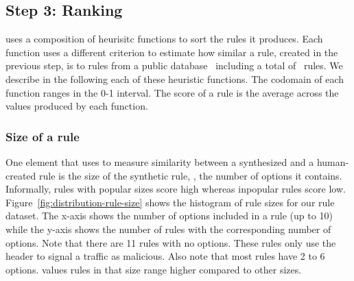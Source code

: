 \documentclass[sigconf,review, anonymous]{acmart}
\begin{document}
\subsection{Step 3: Ranking}

\tname{} uses a composition of heurisitc functions to sort the rules
it produces. Each function uses a different criterion to estimate how
similar a rule, created in the previous step, is to rules from a
public database~\cite{emerging-threats-open} including a total of
\numrulessuri\ rules. We describe in the following each of these
heuristic functions. The codomain of each function ranges in the 0-1
interval. The score of a rule is the average across the values
produced by each function.


\subsubsection{Size of a rule}
One element that \tname{} uses to measure similarity between a
synthesized and a human-created rule is the size of the synthetic
rule, \ie{}, the number of options it contains. Informally, rules with
popular sizes score high whereas inpopular rules score
low. Figure~\ref{fig:distribution-rule-size} shows the histogram of
rule sizes for our rule dataset. The x-axis shows the number of
options included in a rule (up to 10) while the y-axis shows the
number of rules with the corresponding number of options. Note that
there are 11 rules with no options. These rules only use the header to
signal a traffic as malicious. Also note that most rules have 2 to 6
options. \tname{} values rules in that size range higher compared to
other sizes.


\pgfplotsset{width=6cm,compat=1.8}
\end{document}
